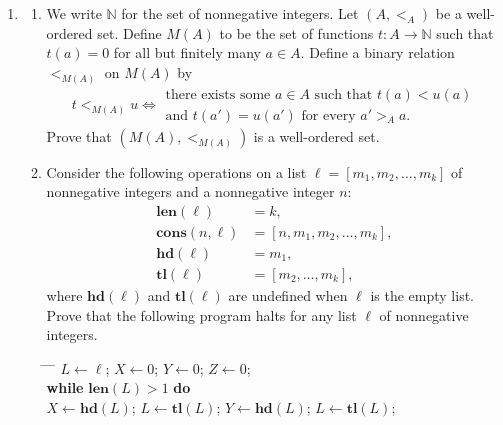 \documentclass{article}
\begin{document}
\begin{enumerate}[label=\fbox{\arabic*}]
  \item \begin{enumerate}[label=(\arabic*)]
          \item We write $\mathbb{N}$ for the set of nonnegative integers. Let $(A, <_A)$ be a well-ordered set. Define $M(A)$ to be the set of functions $t: A \to \mathbb{N}$ such that $t(a) = 0$ for all but finitely many $a \in A$. Define a binary relation $<_{M(A)}$ on $M(A)$ by
                \[
                  t <_{M(A)} u \iff \begin{array}{l} \text{there exists some } a \in A \text{ such that } t(a) < u(a) \\ \text{and } t(a') = u(a') \text{ for every } a' >_A a. \end{array}
                \]
                Prove that $(M(A), <_{M(A)})$ is a well-ordered set.
          \item Consider the following operations on a list $\ell = [m_1, m_2, \dots, m_k]$ of nonnegative integers and a nonnegative integer $n$:
                \begin{align*}
                  \mathbf{len}(\ell)     & = k,                         \\
                  \mathbf{cons}(n, \ell) & = [n, m_1, m_2, \dots, m_k], \\
                  \mathbf{hd}(\ell)      & = m_1,                       \\
                  \mathbf{tl}(\ell)      & = [m_2, \dots, m_k],
                \end{align*}
                where $\mathbf{hd}(\ell)$ and $\mathbf{tl}(\ell)$ are undefined when $\ell$ is the empty list. Prove that the following program halts for any list $\ell$ of nonnegative integers.
                \begin{center}
                  \begin{minipage}{0.7\textwidth}
                    \begin{tabbing}
                      \hspace{2em} \= \hspace{2em} \= \hspace{2em} \= \kill
                      $L \leftarrow \ell$; $X \leftarrow 0$; $Y \leftarrow 0$; $Z \leftarrow 0$; \\
                      \textbf{while} $\mathbf{len}(L) > 1$ \textbf{do} \\
                      \> $X \leftarrow \mathbf{hd}(L)$; $L \leftarrow \mathbf{tl}(L)$; $Y \leftarrow \mathbf{hd}(L)$; $L \leftarrow \mathbf{tl}(L)$; \\

\end{tabbing}
\end{minipage}
\end{center}
\end{enumerate}
\end{enumerate}
\end{document}
